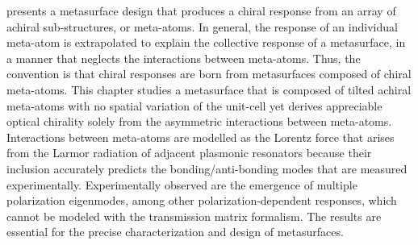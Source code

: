 presents a metasurface design that produces a chiral response from an array of achiral sub-structures, or meta-atoms. In general, the response of an individual meta-atom is extrapolated to explain the collective response of a metasurface, in a manner that neglects the interactions between meta-atoms. Thus, the convention is that chiral responses are born from metasurfaces composed of chiral meta-atoms. This chapter studies a metasurface that is composed of tilted achiral meta-atoms with no spatial variation of the unit-cell yet derives appreciable optical chirality solely from the asymmetric interactions between meta-atoms. Interactions between meta-atoms are modelled as the Lorentz force that arises from the Larmor radiation of adjacent plasmonic resonators because their inclusion accurately predicts the bonding/anti-bonding modes that are measured experimentally. Experimentally observed are the emergence of multiple polarization eigenmodes, among other polarization-dependent responses, which cannot be modeled with the transmission matrix formalism. The results are essential for the precise characterization and design of metasurfaces. 
